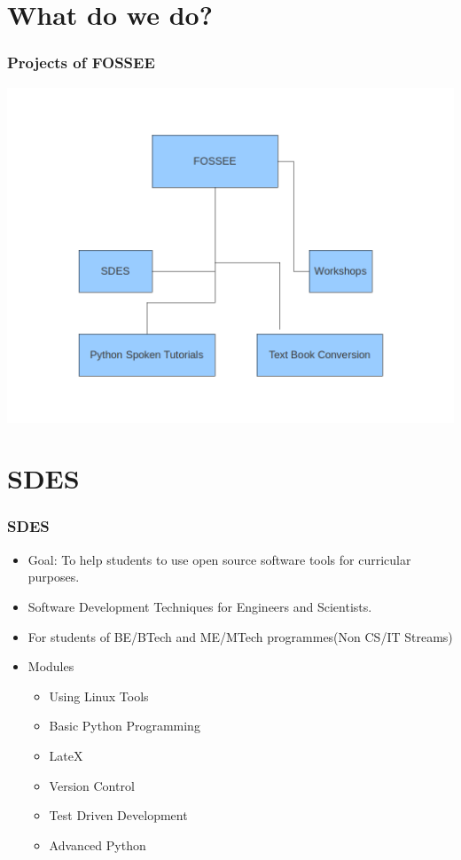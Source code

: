 \documentclass{beamer}
\begin{document}
\section{What do we do?}
\begin{frame}
  \frametitle{Projects of FOSSEE}
  \begin{center}
  	\includegraphics[scale=0.25]{pythonst.png}
  \end{center}
\end{frame}

\section{SDES}
\begin{frame}
  \frametitle{SDES}
    \begin{itemize}
    \item Goal: To help students to use open source software tools for curricular purposes. 
    \item Software Development Techniques for Engineers and Scientists.
    \item For students of BE/BTech and ME/MTech programmes(Non CS/IT Streams)
    \item Modules 
    \begin{itemize}
    \item Using Linux Tools
	\item Basic Python Programming
	\item LateX
	\item Version Control
	\item Test Driven Development
	\item Advanced Python
    \end{itemize}
	\end{itemize}
\end{frame}
\end{document}
